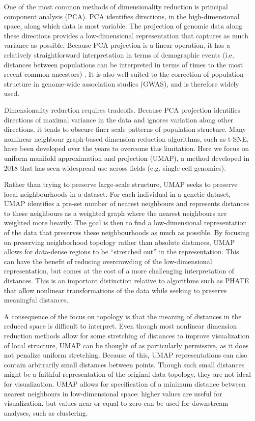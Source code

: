 One of the most common methods of dimensionality reduction is principal component analysis (PCA). PCA identifies directions, in the high-dimensional space, along which data is most variable. The projection of genomic data along these directions provides a low-dimensional representation that captures as much variance as possible. Because PCA projection is a linear operation, it has a relatively straightforward interpretation in terms of demographic events (i.e, distances between populations can be interpreted in terms of times to the most recent common ancestors) \citep{mcvean2009genealogical}.  It is also well-suited to the correction of population structure in genome-wide association studies (GWAS)\citep{patterson2006population}, and is therefore widely used.

Dimensionality reduction requires tradeoffs. Because PCA projection identifies directions of maximal variance in the data and ignores variation along other directions, it tends to obscure finer scale patterns of population structure. Many nonlinear neighbour graph-based dimension reduction algorithms, such as t-SNE\citep{maaten_visualizing_2008}, have been developed over the years to overcome this limitation. Here we focus on uniform manifold approximation and projection (UMAP)\citep{mcinnes_umap_2020}, a method developed in 2018 that has seen widespread use across fields (e.g. single-cell genomics\citep{becht2019dimensionality}). 

Rather than trying to preserve large-scale structure, UMAP seeks to preserve local neighbourhoods in a dataset. For each individual in a genetic dataset, UMAP identifies a pre-set number of nearest neighbours and represents distances to these neighbours as a weighted graph where the nearest neighbours are weighted more heavily. The goal is then to find a low-dimensional representation of the data that preserves these neighbourhoods as much as possible. By focusing on preserving neighborhood topology rather than absolute distances, UMAP allows for data-dense regions to be ``stretched out'' in the representation. This can have the benefit of reducing overcrowding of the low-dimensional representation, but comes at the cost of a more challenging interpretation of distances.  This is an important distinction relative to algorithms such as PHATE \citep{moon2019visualizing} that allow nonlinear transformations of the data while seeking to preserve meaningful distances. 

A consequence of the focus on topology is that the meaning of distances in the reduced space is difficult to interpret. Even though most nonlinear dimension reduction methods allow for some stretching of distances to improve visualization of local structure, UMAP can be thought of as particularly permissive, as it does not penalize uniform stretching. Because of this, UMAP representations can also contain arbitrarily small distances between points. Though such small distances might be a faithful representation of the original data topology, they are not ideal for visualization. UMAP allows for specification of a minimum distance between nearest neighbours in low-dimensional space: higher values are useful for visualization, but values near or equal to zero can be used for downstream analyses, such as clustering.

